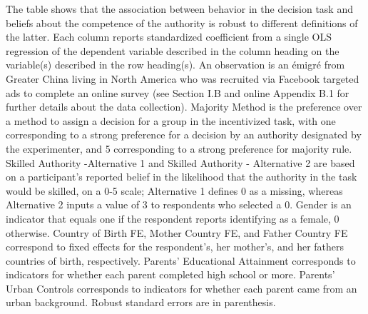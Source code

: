 \documentclass[]{article}
\begin{document}
\begin{adjustwidth}{-1cm}{-1cm}            
    \begin{scriptsize}   
    The table shows that the association between behavior in the decision task and beliefs about the competence of the authority is robust to different definitions of the latter. Each column reports standardized coefficient from a single OLS regression of the dependent variable described in the column heading on the variable(s) described in the row heading(s). An observation is an émigré from Greater China living in North America who was recruited via Facebook targeted ads to complete an online survey (see Section I.B and online Appendix B.1 for further details about the data collection). Majority Method is the preference over a method to assign a decision for a group in the incentivized task, with one corresponding to a strong preference for a decision by an authority designated by the experimenter, and 5 corresponding to a strong preference for majority rule.  Skilled Authority -Alternative 1 and Skilled Authority - Alternative 2 are based on a participant's reported belief in the likelihood that the authority in the task would be skilled, on a 0-5 scale; Alternative 1 defines 0 as a missing, whereas Alternative 2 inputs a value of 3 to respondents who selected a 0. Gender is an indicator that equals one if the respondent reports identifying as a female, 0 otherwise. Country of Birth FE, Mother Country FE, and Father Country FE correspond to fixed effects for the respondent's, her mother's, and her fathers countries of birth, respectively. Parents' Educational Attainment corresponds to indicators for whether each parent completed high school or more. Parents' Urban Controls corresponds to indicators for whether each parent came from an urban background. Robust standard errors are in parenthesis.
    \end{scriptsize} 
\end{adjustwidth}
\end{document}

